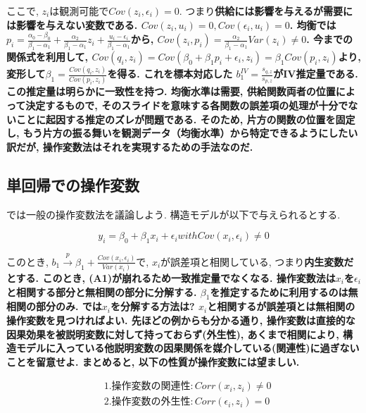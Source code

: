 \documentclass[paper=a4paper,fontsize=10pt]{jlreq}
\begin{document}
ここで, $z_i$は観測可能で$Cov(z_i, \epsilon_i) = 0$. つまり\rmfamily\mcfamily\bfseries{供給には影響を与えるが需要には影響を与えない変数}\mdseries である. $Cov(z_i, u_i) = 0, Cov(\epsilon_i, u_i) = 0$. 均衡では$p_i = \frac{\alpha_0 - \beta_0}{\beta_1 - \alpha_1} + \frac{\alpha_2}{\beta_1 - \alpha_1} z_i + \frac{u_i - \epsilon_i}{\beta_1 - \alpha_1}$から, $Cov(z_i, p_i) = \frac{\alpha_2}{\beta_1 - \alpha_1}Var(z_i) \neq 0$. 今までの関係式を利用して, $Cov(q_i, z_i) = Cov(\beta_0 + \beta_1 p_i + \epsilon_i, z_i) = \beta_1 Cov(p_i, z_i)$より, 変形して$\beta_1 = \frac{Cov(q_i, z_i)}{Cov(p_i, z_i)}$を得る. これを標本対応した $b_1^{IV} = \frac{s_{q,z}}{s_{p,z}}$が\rmfamily\mcfamily\bfseries{IV推定量}\mdseries である. この推定量は明らかに\rmfamily\mcfamily\bfseries{一致性を持つ}\mdseries . 均衡水準は需要, 供給関数両者の位置によって決定するもので, そのスライドを意味する各関数の誤差項の処理が十分でないことに起因する推定のズレが問題である. そのため, \rmfamily\mcfamily\bfseries{片方の関数の位置を固定し, もう片方の振る舞いを観測データ（均衡水準）から特定できるようにしたい}\mdseries 訳だが, 操作変数法はそれを実現するための手法なのだ.\\

\subsection{単回帰での操作変数}
では一般の操作変数法を議論しよう. 構造モデルが以下で与えられるとする.

\begin{equation*}
  y_i = \beta_0 + \beta_1 x_i + \epsilon_i　with　Cov(x_i, \epsilon_i) \neq 0
\end{equation*}

このとき, $b_1 \overset{p}{\to} \beta_1 + \frac{Cov(x_i, \epsilon_i)}{Var(x_i)}$で, $x_i$が誤差項と相関している, つまり\rmfamily\mcfamily\bfseries{内生変数}\mdseries だとする. このとき, (A1)が崩れるため一致推定量でなくなる. 操作変数法は$x_i$を$\epsilon_i$と相関する部分と無相関の部分に分解する. $\beta_1$を推定するために利用するのは\rmfamily\mcfamily\bfseries{無相関の部分のみ}\mdseries . では$x_i$を分解する方法は? $x_i$と相関するが誤差項とは無相関の操作変数を見つければよい. 先ほどの例からも分かる通り, 操作変数は直接的な因果効果を被説明変数に対して持っておらず(外生性), あくまで相関により, 構造モデルに入っている他説明変数の因果関係を媒介している(関連性)に過ぎないことを留意せよ. まとめると, 以下の性質が操作変数には望ましい.

\begin{align*}
  &1. 操作変数の関連性:　Corr(x_i , z_i ) \neq 0\\
  &2. 操作変数の外生性:　Corr(\epsilon_i , z_i ) = 0
\end{align*}
\end{document}
